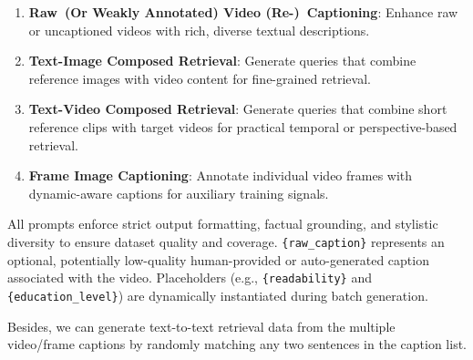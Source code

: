 \begin{enumerate}
    \item \textbf{Raw~(Or Weakly Annotated) Video (Re-)~Captioning}: Enhance raw or uncaptioned videos with rich, diverse textual descriptions.
    \item \textbf{Text-Image Composed Retrieval}: Generate queries that combine reference images with video content for fine-grained retrieval.
    \item \textbf{Text-Video Composed Retrieval}: Generate queries that combine short reference clips with target videos for practical temporal or perspective-based retrieval.
    \item \textbf{Frame Image Captioning}: Annotate individual video frames with dynamic-aware captions for auxiliary training signals.
\end{enumerate}

All prompts enforce strict output formatting, factual grounding, and stylistic diversity to ensure dataset quality and coverage. \texttt{\{raw\_caption\}} represents an optional, potentially low-quality human-provided or auto-generated caption associated with the video. Placeholders (e.g., \texttt{\{readability\}} and \texttt{\{education\_level\}}) are dynamically instantiated during batch generation.

Besides, we can generate text-to-text retrieval data from the multiple video/frame captions by randomly matching any two sentences in the caption list.

